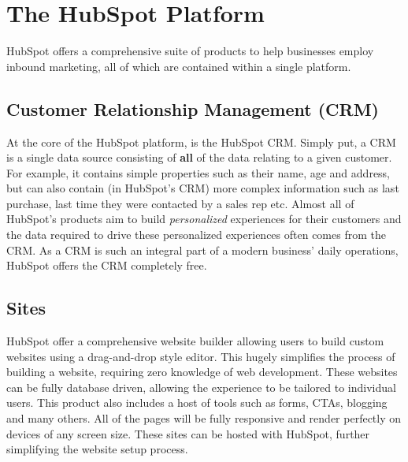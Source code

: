 \section{The HubSpot Platform}
HubSpot offers a comprehensive suite of products to help businesses employ inbound marketing, all of which are contained within a single platform.

\subsection{Customer Relationship Management (CRM)}
At the core of the HubSpot platform, is the HubSpot CRM. Simply put, a CRM is a single data source consisting of \textbf{all} of the data relating to a given customer. For example, it contains simple properties such as their name, age and address, but can also contain (in HubSpot's CRM) more complex information such as last purchase, last time they were contacted by a sales rep etc. Almost all of HubSpot's products aim to build \textit{personalized} experiences for their customers and the data required to drive these personalized experiences often comes from the CRM. As a CRM is such an integral part of a modern business' daily operations, HubSpot offers the CRM completely free. 

\subsection{Sites}
HubSpot offer a comprehensive website builder allowing users to build custom websites using a drag-and-drop style editor. This hugely simplifies the process of building a website, requiring zero knowledge of web development. These websites can be fully database driven, allowing the experience to be tailored to individual users. This product also includes a host of tools such as forms, CTAs, blogging and many others. All of the pages will be fully responsive and render perfectly on devices of any screen size. These sites can be hosted with HubSpot, further simplifying the website setup process.

